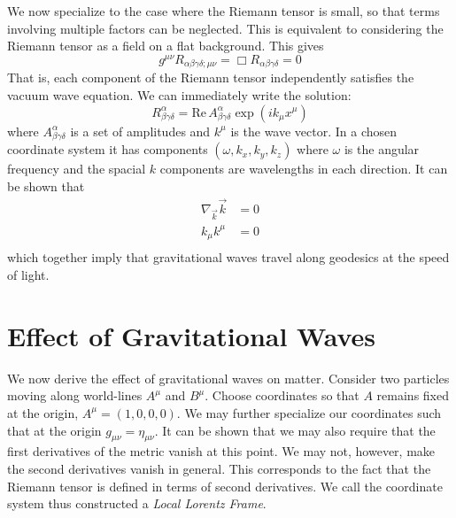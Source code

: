 We now specialize to the case where the Riemann tensor is small, so
that terms involving multiple factors can be neglected.  This is
equivalent to considering the Riemann tensor as a field on a flat
background.  This gives
%
\begin{equation}
\label{eq:riemann_wave}
g^{\mu\nu}
R_{\alpha\beta\gamma\delta;\mu\nu}
=
\Box R_{\alpha\beta\gamma\delta}
= 0
\end{equation}
%
That is, each component of the Riemann tensor independently 
satisfies the vacuum wave equation.  We can immediately write the
solution:
%
\begin{equation}
R^\alpha_{\beta\gamma\delta} = 
\textrm{Re}\, A^\alpha_{\beta\gamma\delta} \exp(i k_\mu x^\mu)
\end{equation}
%
where $A^\alpha_{\beta\gamma\delta}$ is a set of amplitudes and
$k^\mu$ is the wave vector.  In a chosen coordinate system it has
components $(\omega, k_x, k_y, k_z)$ where $\omega$ is the angular
frequency and the spacial $k$ components are wavelengths in each
direction.  It can be shown that 
%
\begin{align*}
\nabla_{\vec k} \vec{k} &= 0 \\
k_\mu k^\mu &= 0 \\
\end{align*}
%
which together imply that gravitational waves travel along geodesics 
at the speed of light.


\section{Effect of Gravitational Waves}
\label{sec:effects_of_waves}

We now derive the effect of gravitational waves on matter.  Consider
two particles moving along world-lines $A^\mu$ and $B^\mu$.  Choose
coordinates so that $A$ remains fixed at the origin, $A^\mu =
(1,0,0,0)$.  We may further specialize our coordinates such that at
the origin $g_{\mu\nu} = \eta_{\mu\nu}$.  It can be shown that we may
also require that the first derivatives of the metric vanish at this
point.  We may not, however, make the second derivatives vanish in
general.  This corresponds to the fact that the Riemann tensor is
defined in terms of second derivatives.  We call the coordinate system
thus constructed a \emph{Local Lorentz Frame}.


